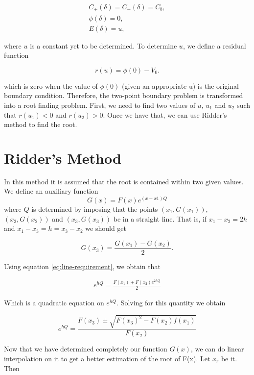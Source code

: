 \begin{align}
\label{eq:one-point-boundary-conditon}
	C_+(\delta) = C_-(\delta) = C_b,\\
	\phi(\delta) = 0,\\
	E(\delta) = u, 
\end{align}



where $u$ is a constant yet to be determined. To determine $u$, we define a residual function

$$r(u) = \phi(0)-V_0.$$

which is zero when the value of $\phi(0)$ (given an appropriate u) is the original boundary condition. Therefore, the two-point boundary problem is transformed into a  root finding problem. First, we need to find two values of $u$, $u_1$ and $u_2$ such that $r(u_1) < 0$ and  $r(u_2) > 0$. Once we have that, we can use Ridder's method to find the root.

\section{Ridder's Method}

In this method it is assumed that the root is contained within two given values.  We define an auxiliary function 
$$G(x) = F(x)e^{(x-x1)Q}$$
where $Q$ is determined by imposing that the points $(x_1, G(x_1))$, $(x_2, G(x_2))$ and $(x_3, G(x_3))$ be in a straight line. That is, if $x_1-x_2 = 2h$ and $x_1-x_3 = h = x_3-x_2$ we should get

\begin{equation}
G(x_3) = \frac{G(x_1)-G(x_2)}{2}.
\label{eq:line-requirement}
\end{equation}

Using equation \ref{eq:line-requirement}, we obtain that

\begin{eqnarray}
e^{hQ} = \frac{F(x_1)+F(x_2)e^{2hQ}}{2}
\end{eqnarray}

Which is a quadratic equation on $e^{hQ}$. Solving for this quantity we obtain

\begin{equation}
e^{hQ} = \frac{F(x_3)\pm\sqrt{F(x_3)^2-F(x_2)f(x_1)}}{F(x_2)}
\end{equation}

Now that we have determined completely our function $G(x)$, we can do linear interpolation on it to get a better estimation of the root of F(x). Let $x_r$  be it. Then

